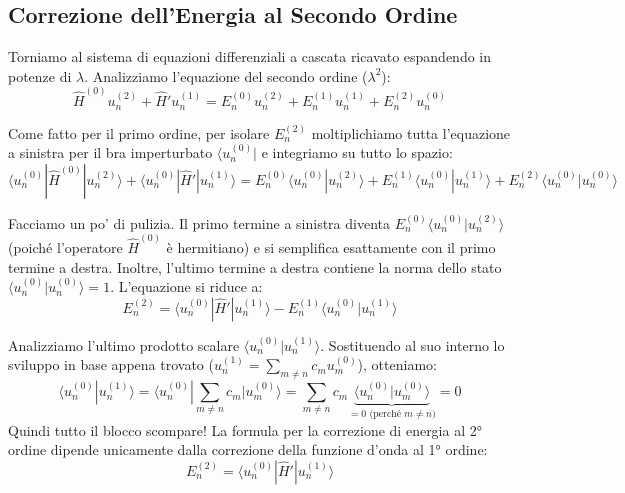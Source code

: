 \documentclass[11pt, a4paper]{article}
\begin{document}
\subsection{Correzione dell'Energia al Secondo Ordine} %

Torniamo al sistema di equazioni differenziali a cascata ricavato espandendo in potenze di $\lambda$. Analizziamo l'equazione del secondo ordine ($\lambda^2$): %
\begin{equation*}
    \hat{H}^{(0)} u_n^{(2)} + \hat{H}' u_n^{(1)} = E_n^{(0)} u_n^{(2)} + E_n^{(1)} u_n^{(1)} + E_n^{(2)} u_n^{(0)} %
\end{equation*}

\noindent
Come fatto per il primo ordine, per isolare $E_n^{(2)}$ moltiplichiamo tutta l'equazione a sinistra per il bra imperturbato $\langle u_n^{(0)} |$ e integriamo su tutto lo spazio: %
\begin{equation*}
    \langle u_n^{(0)} | \hat{H}^{(0)} | u_n^{(2)} \rangle + \langle u_n^{(0)} | \hat{H}' | u_n^{(1)} \rangle = E_n^{(0)} \langle u_n^{(0)} | u_n^{(2)} \rangle + E_n^{(1)} \langle u_n^{(0)} | u_n^{(1)} \rangle + E_n^{(2)} \langle u_n^{(0)} | u_n^{(0)} \rangle %
\end{equation*}

\noindent
Facciamo un po' di pulizia. Il primo termine a sinistra diventa $E_n^{(0)} \langle u_n^{(0)} | u_n^{(2)} \rangle$ (poiché l'operatore $\hat{H}^{(0)}$ è hermitiano) e si semplifica esattamente con il primo termine a destra. %
Inoltre, l'ultimo termine a destra contiene la norma dello stato $\langle u_n^{(0)} | u_n^{(0)} \rangle = 1$. L'equazione si riduce a: %
\begin{equation*}
    E_n^{(2)} = \langle u_n^{(0)} | \hat{H}' | u_n^{(1)} \rangle - E_n^{(1)} \langle u_n^{(0)} | u_n^{(1)} \rangle %
\end{equation*}

\noindent
Analizziamo l'ultimo prodotto scalare $\langle u_n^{(0)} | u_n^{(1)} \rangle$. Sostituendo al suo interno lo sviluppo in base appena trovato ($u_n^{(1)} = \sum_{m \neq n} c_m u_m^{(0)}$), otteniamo: %
\begin{equation*}
    \langle u_n^{(0)} | u_n^{(1)} \rangle = \langle u_n^{(0)} | \sum_{m \neq n} c_m | u_m^{(0)} \rangle = \sum_{m \neq n} c_m \underbrace{ \langle u_n^{(0)} | u_m^{(0)} \rangle }_{=0 \text{ (perché } m \neq n \text{)}} = 0 %
\end{equation*}
Quindi tutto il blocco scompare! La formula per la correzione di energia al 2° ordine dipende unicamente dalla correzione della funzione d'onda al 1° ordine: %
\begin{equation*}
    E_n^{(2)} = \langle u_n^{(0)} | \hat{H}' | u_n^{(1)} \rangle %
\end{equation*}
\end{document}
